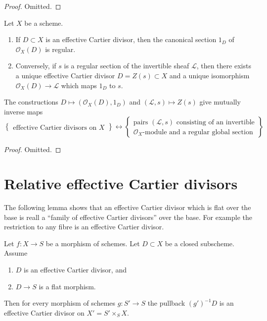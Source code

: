 \begin{proof}
Omitted.
\end{proof}

\begin{lemma}
\label{lemma-characterize-OD}
Let $X$ be a scheme.
\begin{enumerate}
\item If $D \subset X$ is an effective Cartier divisor, then
the canonical section $1_D$ of $\mathcal{O}_X(D)$ is regular.
\item Conversely, if $s$ is a regular section of the invertible
sheaf $\mathcal{L}$, then there exists a unique effective
Cartier divisor $D = Z(s) \subset X$ and a unique isomorphism
$\mathcal{O}_X(D) \to \mathcal{L}$ which maps $1_D$ to $s$.
\end{enumerate}
The constructions
$D \mapsto (\mathcal{O}_X(D), 1_D)$ and $(\mathcal{L}, s) \mapsto Z(s)$
give mutually inverse maps
$$
\left\{
\begin{matrix}
\text{effective Cartier divisors on }X
\end{matrix}
\right\}
\leftrightarrow
\left\{
\begin{matrix}
\text{pairs }(\mathcal{L}, s)\text{ consisting of an invertible}\\
\mathcal{O}_X\text{-module and a regular global section}
\end{matrix}
\right\}
$$
\end{lemma}

\begin{proof}
Omitted.
\end{proof}


















\section{Relative effective Cartier divisors}
\label{section-effective-Cartier-morphisms}

\noindent
The following lemma shows that an effective Cartier divisor which is
flat over the base is reall a ``family of effective Cartier divisors''
over the base. For example the restriction to any fibre is an effective
Cartier divisor.

\begin{lemma}
\label{lemma-relative-Cartier}
Let $f : X \to S$ be a morphism of schemes.
Let $D \subset X$ be a closed subscheme.
Assume
\begin{enumerate}
\item $D$ is an effective Cartier divisor, and
\item $D \to S$ is a flat morphism.
\end{enumerate}
Then for every morphism of schemes $g : S' \to S$ the pullback
$(g')^{-1}D$ is an effective Cartier divisor on $X' = S' \times_S X$.
\end{lemma}


